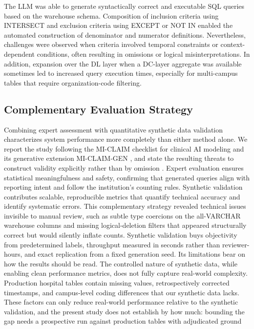 \documentclass[applsci,article,submit,pdftex,oneauthor]{Definitions/mdpi}
\begin{document}
The LLM was able to generate syntactically correct and executable SQL queries
based on the warehouse schema. Composition of inclusion criteria using
INTERSECT and exclusion criteria using EXCEPT or NOT IN enabled the automated
construction of denominator and numerator definitions. Nevertheless, challenges
were observed when criteria involved temporal constraints or context-dependent
conditions, often resulting in omissions or logical misinterpretations. In
addition, expansion over the DL layer when a DC-layer aggregate was available
sometimes led to increased query execution times, especially for multi-campus
tables that require organization-code filtering.

\subsection{Complementary Evaluation Strategy}
Combining expert assessment with quantitative synthetic data validation characterizes system performance more completely than either method alone. We report the study following the MI-CLAIM checklist for clinical AI modeling and its generative extension MI-CLAIM-GEN \cite{miclaim2020,miclaimgen2024}, and state the resulting threats to construct validity explicitly rather than by omission \cite{validity2023}.
Expert evaluation
ensures statistical meaningfulness and safety, confirming that generated queries
align with reporting intent and follow the institution's counting rules.
Synthetic validation contributes scalable, reproducible metrics that quantify
technical accuracy and identify systematic errors. This complementary strategy
revealed technical issues invisible to manual review, such as subtle type
coercions on the all-VARCHAR warehouse columns and missing logical-deletion
filters that appeared structurally correct but would silently inflate counts.
Synthetic validation buys objectivity from predetermined labels, throughput measured in seconds rather than reviewer-hours, and exact replication from a fixed generation seed. Its limitations bear on how the results should be read. The controlled nature of synthetic data, while enabling
clean performance metrics, does not fully capture real-world complexity.
Production hospital tables contain missing values, retrospectively corrected
timestamps, and campus-level coding differences that our synthetic data lacks.
These factors can only reduce real-world performance relative to the synthetic
validation, and the present study does not establish by how much: bounding the
gap needs a prospective run against production tables with adjudicated ground
\end{document}
